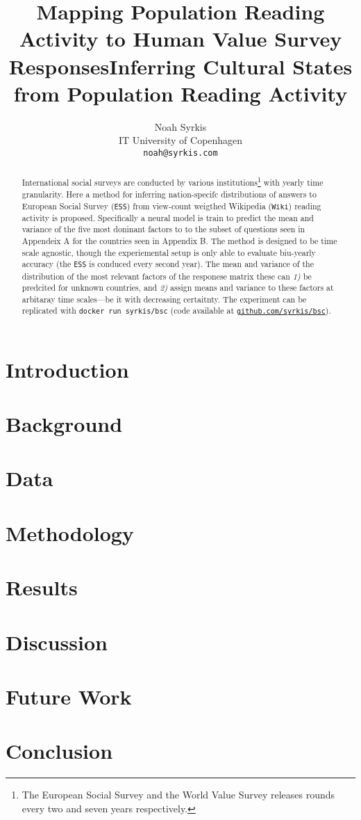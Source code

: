 \documentclass[11pt]{article}
\title{Mapping Population Reading Activity to Human Value Survey Responses}
\title{Inferring Cultural States from Population Reading Activity}
\author{Noah Syrkis \\
  IT University of Copenhagen \\
  \texttt{noah@syrkis.com} \\}
\begin{document}
\maketitle
\begin{abstract}
    International social surveys are conducted by various institutions\footnote{The European Social Survey and the World Value Survey releases rounds every two and seven years respectively.} with yearly time granularity.
    Here a method for inferring nation-specifc distributions of answers to European Social Survey (\texttt{ESS}) from view-count weigthed Wikipedia (\texttt{Wiki}) reading activity is proposed.
    Specifically a neural model is train to predict the mean and variance of the five most doninant factors to to the subset of questions seen in Appendeix A for the countries seen in Appendix B.
    The method is designed to be time scale agnostic, though the experiemental setup is only able to evaluate biu-yearly accuracy (the \texttt{ESS} is conduced every second year).
    The mean and variance of the distribution of the most relevant factors of the responese matrix these can \emph{1)} be predcited for unknown countries, and \emph{2)} assign means and variance to these factors at arbitaray time scales—be it with decreasing certaitnty.
    The experiment can be replicated with \texttt{docker run syrkis/bsc} (code available at \href{https://github.com/syrkis/bsc}{\texttt{github.com/syrkis/bsc}}).

\end{abstract}

\section{Introduction}


\section{Background}


\section{Data}


\section{Methodology}


\section{Results}


\section{Discussion}


\section{Future Work}


\section{Conclusion}



\end{document}
